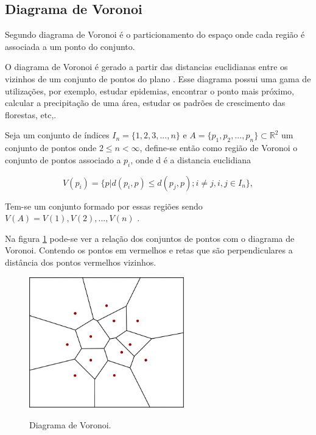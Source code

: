 \subsection{Diagrama de Voronoi}
\label{subsec:diagrama_de_voronoi}

Segundo  diagrama de Voronoi é o particionamento do espaço onde cada região é associada a um ponto do conjunto.

O diagrama de Voronoi é gerado a partir das distancias euclidianas entre os vizinhos de um conjunto de pontos do plano\space
\cite{diagrama_de_voronoi:_uma_exploracao_nas_distancias_euclidiana_e_do_taxi}. Esse diagrama possui uma gama de utilizações, por exemplo, estudar epidemias, encontrar o
ponto mais próximo, calcular a precipitação de uma área, estudar os padrões de crescimento das florestas, etc,\space\cite{poligonos_de_thiessen_ou_voronoi}.

Seja um conjunto de índices $I_n = \{1, 2, 3, ..., n\}$ e $A = \{p_1, p_2, ..., p_n\} \subset \mathbb{R}^2$ um conjunto de pontos onde $2 \leq n < \infty$, define-se então como região de Voronoi o conjunto de pontos associado a $p_i$, onde d é a distancia euclidiana

\begin{equation}
	V(p_i) = \{p|d(p_i,p) \leq d(p_j,p);i \neq j, i, j \in I_n\},
\end{equation}

Tem-se um conjunto formado por essas regiões sendo $V(A) = {V(1), V(2), ..., V(n)}$ \space\cite{rodrigues_diagrama_2019}.

Na figura \cref{fig:diagrama_voronoi} pode-se ver a relação dos conjuntos de pontos com o diagrama de Voronoi. Contendo os pontos em vermelhos e retas que são perpendiculares a distância dos pontos vermelhos vizinhos.

\begin{figure}[ht]
	\centering
	\caption{Diagrama de Voronoi.}
	\includegraphics[width=0.6\textwidth]{figures/diagrama_voronoi.png}
	\label{fig:diagrama_voronoi}
\end{figure}
